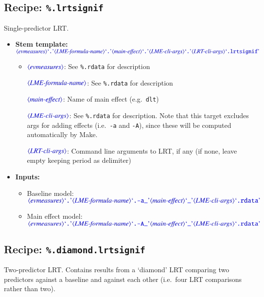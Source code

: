 \documentclass[12pt]{report}
\def\blue{\color{blue}}
\begin{document}
\subsection{Recipe: {\blue\tt \%.lrtsignif}}
Single-predictor LRT.

\begin{itemize}
\item\textbf{Stem template:}\\
$\dtype{evmeasures} \dcode{.} \dtype{LME-formula-name} \dcode{.} \dtype{main-effect} \dcode{.} \dtype{LME-cli-args} \dcode{.} \dtype{LRT-cli-args} \dcode{.lrtsignif}$
\begin{itemize}
\item
$\dtype{evmeasures}$: See {\tt\blue \%.rdata} for description

$\dtype{LME-formula-name}$: See {\tt\blue \%.rdata} for description

$\dtype{main-effect}$: Name of main effect (e.g.\ {\tt\blue dlt})

$\dtype{LME-cli-args}$: See {\tt\blue \%.rdata} for description.
Note that this target excludes args for adding effects (i.e.\ {\tt\blue -a} and {\tt\blue -A}), since these will be computed automatically by Make.

$\dtype{LRT-cli-args}$: Command line arguments to LRT, if any (if none, leave empty keeping period as delimiter)

\end{itemize}

\item\textbf{Inputs:}
\begin{itemize}
\item Baseline model: $\dtype{evmeasures} \dcode{.} \dtype{LME-formula-name} \dcode{.-a\_} \dtype{main-effect} \dcode{\_} \dtype{LME-cli-args} \dcode{.rdata}$ 
\item Main effect model: $\dtype{evmeasures} \dcode{.} \dtype{LME-formula-name} \dcode{.-A\_} \dtype{main-effect} \dcode{\_} \dtype{LME-cli-args} \dcode{.rdata}$ 
\end{itemize}
\end{itemize}

\subsection{Recipe: {\blue\tt \%.diamond.lrtsignif}}

Two-predictor LRT.
Contains results from a `diamond' LRT comparing two predictors against a baseline and against each other (i.e.\ four LRT comparisons rather than two).
\end{document}
